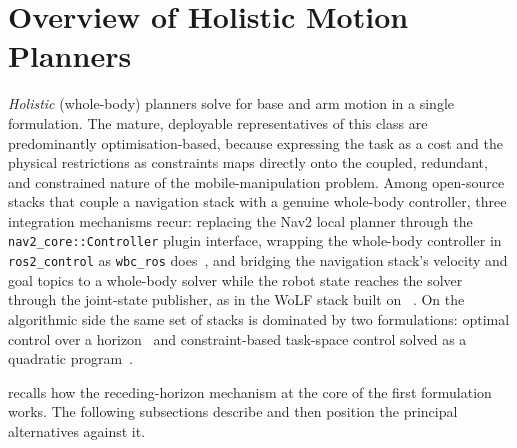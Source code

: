 \section{Overview of Holistic Motion Planners}
\label{sec:sota-holistic}

\emph{Holistic} (whole-body) planners solve for base and arm motion in a
single formulation. The mature, deployable representatives of this class
are predominantly optimisation-based, because expressing the task as a
cost and the physical restrictions as constraints maps directly onto the
coupled, redundant, and constrained nature of the mobile-manipulation
problem. Among open-source stacks that couple a navigation stack with a
genuine whole-body controller, three integration mechanisms recur:
replacing the Nav2 local planner through the
\texttt{nav2\_core::Controller} plugin interface, wrapping the whole-body
controller in \texttt{ros2\_control} as
\texttt{wbc\_ros} does~\cite{wbcros,ros2control}, and bridging the
navigation stack's velocity and goal topics to a whole-body solver while
the robot state reaches the solver through the joint-state publisher, as
in the WoLF stack built on \ocs{}~\cite{wolfsetup}. On the algorithmic
side the same set of stacks is dominated by two formulations: optimal
control over a horizon~\cite{Sleiman2021UnifiedMPC,Pankert2020PerceptiveMPC}
and constraint-based task-space control solved as a quadratic
program~\cite{Stelter2022OpenSource,Stueben2021ConstraintWBC}.

 recalls how the receding-horizon mechanism at
the core of the first formulation works. The following subsections
describe \ocs{} and then position the principal alternatives against it.

